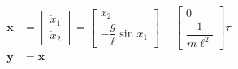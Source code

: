\documentclass[border=0pt]{standalone}
\begin{document}
\noindent
\begin{minipage}{4.2cm}
  \begin{align*}
    \dot{\mathbf{x}} &=
    \begin{bmatrix}
      \dot{x}_1 \\
      \dot{x}_2
    \end{bmatrix}
    =
    \begin{bmatrix}
      x_2 \\
      -\dfrac{g}{\ell} \sin x_1
    \end{bmatrix}
    +
    \begin{bmatrix}
      0 \\
      \dfrac{1}{m\ell^2}
    \end{bmatrix} \tau \\[0.5em]
    \mathbf{y} &= \mathbf{x}
  \end{align*}
\end{minipage}
\end{document}

